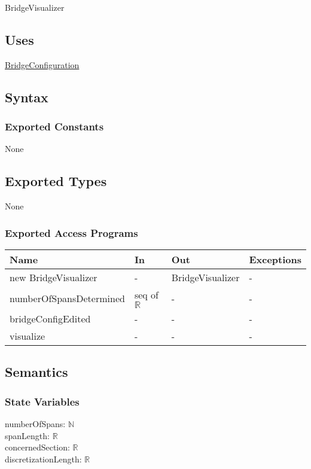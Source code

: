 \documentclass[12pt, titlepage]{article}
\begin{document}
BridgeVisualizer

\subsection{Uses}
\hyperref[BridgeConfiguration]{BridgeConfiguration}

\subsection{Syntax}

\subsubsection{Exported Constants}
None
\subsection{Exported Types}
None

\subsubsection{Exported Access Programs}
\begin{center}
\begin{tabular}{p{5cm} p{2cm} p{4cm} p{5.5cm}}
\hline
\textbf{Name} & \textbf{In} & \textbf{Out} & \textbf{Exceptions} \\
\hline
new BridgeVisualizer & - & BridgeVisualizer & -\\
\hline
numberOfSpansDetermined & seq of $\mathbb{R}$ & - & -\\
\hline
bridgeConfigEdited & - & - & -\\
\hline
visualize & - & - & -\\
\hline
\end{tabular}
\end{center}

\subsection{Semantics}

\subsubsection{State Variables}
numberOfSpans: $\mathbb{N}$\\
spanLength: $\mathbb{R}$\\
concernedSection: $\mathbb{R}$\\
discretizationLength: $\mathbb{R}$
\end{document}
